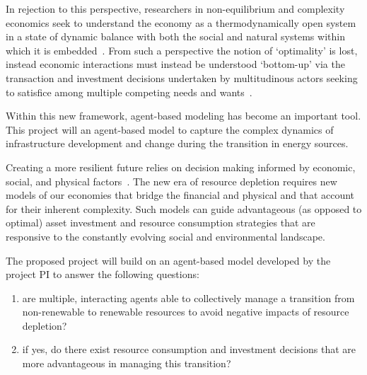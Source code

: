 \documentclass[11pt,a4paper]{article}
\begin{document}
In rejection to this perspective,
researchers in non-equilibrium and complexity economics
seek to understand the economy as a 
thermodynamically open system in a state of dynamic balance
with both the social and natural systems within which it is embedded~\cite{}.
From such a perspective the notion of `optimality' is lost,
instead economic interactions must instead be understood
`bottom-up' via the transaction and investment decisions
undertaken by multitudinous actors seeking to 
satisfice among multiple competing needs and wants~\cite{}.

Within this new framework,
agent-based modeling has become an important tool.
This project will an agent-based model to capture the 
complex dynamics of infrastructure development 
and change during the transition in energy sources. 

Creating a more resilient future
relies on decision making informed by 
economic, 
social,
and physical factors~\cite{Heun2015}.
The new era of resource depletion requires
new models of our economies that bridge the financial and physical
and that account for their inherent complexity.
Such models can guide advantageous (as opposed to optimal)
asset investment and resource consumption strategies
that are responsive to the constantly evolving 
social and environmental landscape.

The proposed project will build on an agent-based model
developed by the project PI to answer the following questions:
\begin{enumerate}
\vspace{-9pt}
\setlength{\itemsep}{-3pt}
	\item	are multiple, interacting agents able to collectively manage 
				a transition from non-renewable to renewable resources 
				to avoid negative impacts of resource depletion?
	\item	if yes, do there exist resource consumption and investment decisions
				that are more advantageous in managing this transition?
\end{enumerate}


%
\end{document}
